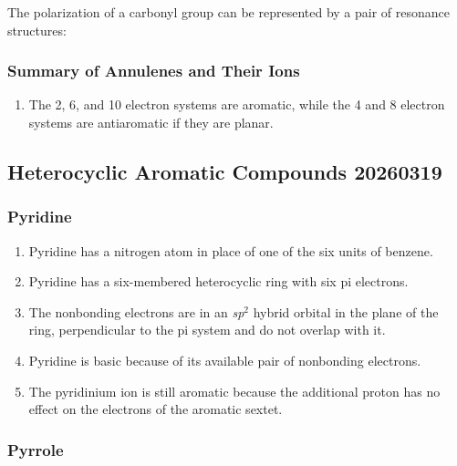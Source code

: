 \begin{example} %
    The polarization of a carbonyl group can be represented by a pair of resonance structures:
\end{example}

\subsubsection{Summary of Annulenes and Their Ions}

\begin{enumerate}
    \item The 2, 6, and 10 electron systems are aromatic, while the 4 and 8 electron systems are antiaromatic if they are planar.
\end{enumerate}

\subsection{Heterocyclic Aromatic Compounds 20260319}

\subsubsection{Pyridine}

\begin{enumerate}
    \item Pyridine has a nitrogen atom in place of one of the six  units of benzene.
    \item Pyridine has a six-membered heterocyclic ring with six pi electrons.
    \item The nonbonding electrons are in an \textit{sp}$^2$ hybrid orbital in the plane of the ring, perpendicular to the pi system and do not overlap with it.
    \item Pyridine is basic because of its available pair of nonbonding electrons.
    \item The pyridinium ion is still aromatic because the additional proton has no effect on the electrons of the aromatic sextet.
\end{enumerate}

\subsubsection{Pyrrole}

